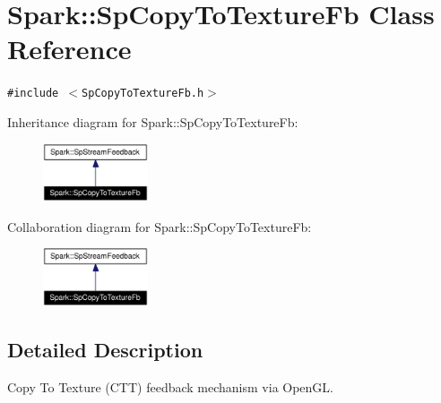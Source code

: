\section{Spark::Sp\-Copy\-To\-Texture\-Fb Class Reference}
\label{classSpark_1_1SpCopyToTextureFb}
{\tt \#include $<$Sp\-Copy\-To\-Texture\-Fb.h$>$}

Inheritance diagram for Spark::Sp\-Copy\-To\-Texture\-Fb:\begin{figure}[H]
\begin{center}
\leavevmode
\includegraphics[width=88pt]{classSpark_1_1SpCopyToTextureFb__inherit__graph}
\end{center}
\end{figure}
Collaboration diagram for Spark::Sp\-Copy\-To\-Texture\-Fb:\begin{figure}[H]
\begin{center}
\leavevmode
\includegraphics[width=88pt]{classSpark_1_1SpCopyToTextureFb__coll__graph}
\end{center}
\end{figure}


\subsection{Detailed Description}
Copy To Texture (CTT) feedback mechanism via Open\-GL. 

